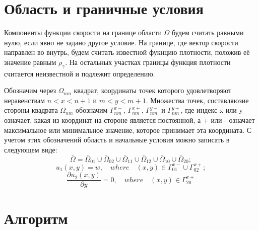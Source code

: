 \section{Область и граничные условия}
Компоненты функции скорости на границе области $\Omega$ будем считать равными нулю, если явно не задано другое условие. На границе, где вектор скорости направлен во внутрь, будем считать известной фукнцию плотности, положив её значение равным $\rho_{\gamma}$. На остальных участках границы функция плотности считается неизвестной и подлежит определению.

Обозначим через $\Omega_{nm}$ квадрат, координаты точек которого удовлетворяют неравенствам $n < x < n + 1$ и $m < y < m + 1$. Множества точек, составляюзие стороны квадрата $\Omega_{nm}$ обозначим $\Gamma^{x-}_{nm}$, $\Gamma^{x+}_{nm}$, $\Gamma^{y-}_{nm}$ и $\Gamma^{y+}_{nm}$, где индекс x или y означает, какая из координат на стороне является постоянной, а + или - означает максимальное или минимальное значение, которое принимает эта координата. С учетом этих обозначений область и начальные условия можно записать в следующем виде:
\begin{equation*}
\bar{\Omega} = \bar{\Omega}_{01}\cup\bar{\Omega}_{02}\cup\bar{\Omega}_{11}\cup\bar{\Omega}_{12}\cup\bar{\Omega}_{10}\cup\bar{\Omega}_{20};
\end{equation*}
\begin{equation*}
u_1(x, y) = w, \quad where \quad (x, y)\in \Gamma^{x-}_{01}\cup\Gamma^{x+}_{02};
\end{equation*}
\begin{equation*}
\dfrac{\partial u_2 (x, y)}{\partial y} = 0, \quad where \quad (x, y)\in \Gamma^{x+}_{20}
\end{equation*}



\section{\LARGE Алгоритм}

